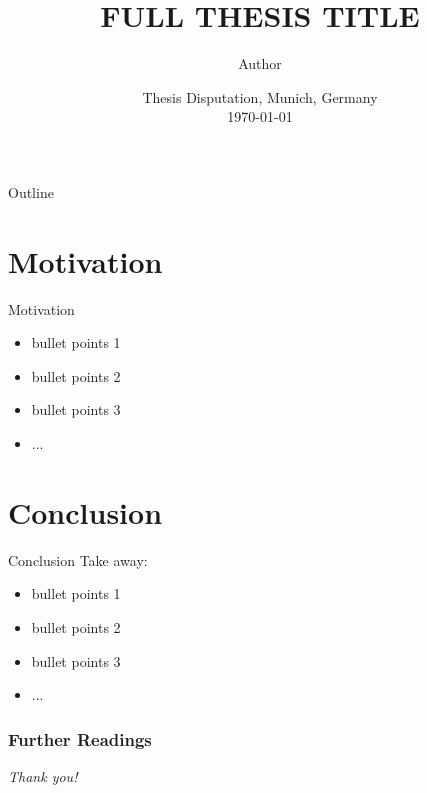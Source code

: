 \documentclass[10pt]{beamer}
\title[Short Thesis Title]{
    FULL THESIS TITLE
}
\author[Author, Year]{
    Author
}
\institute[LMU]{
    University of Munich \\
    \texttt{\href{firstname.lastname@campus.lmu.de}{firstname.lastname@campus.lmu.de}}
    }
\date[Thesis Disputation, \today, \Year]{
    Thesis Disputation, Munich, Germany\\
    \today
}
\begin{document}
\begin{frame}
\titlepage
\end{frame}

\begin{frame}{Outline}
    \tableofcontents
\end{frame}


\section{Motivation}
\begin{frame}{Motivation}
    \begin{itemize}
        \item bullet points 1 \pause
        \item bullet points 2 \pause
        \item bullet points 3 \cite{lamport1994latex} \pause
        \item ...
    \end{itemize}
\end{frame}

\section{Conclusion}
\begin{frame}{Conclusion}
    \small
    Take away:
    \pause
    \begin{itemize}
        \item bullet points 1
        \item bullet points 2
        \item bullet points 3 \cite{lamport2007writings}
        \item ...
    \end{itemize}
\end{frame}

\begin{frame}[allowframebreaks]
\frametitle{{Further Readings}}


\end{frame}

\begin{frame}{}
    \centering \Large
    \emph{Thank you!}
  \end{frame}
\end{document}
